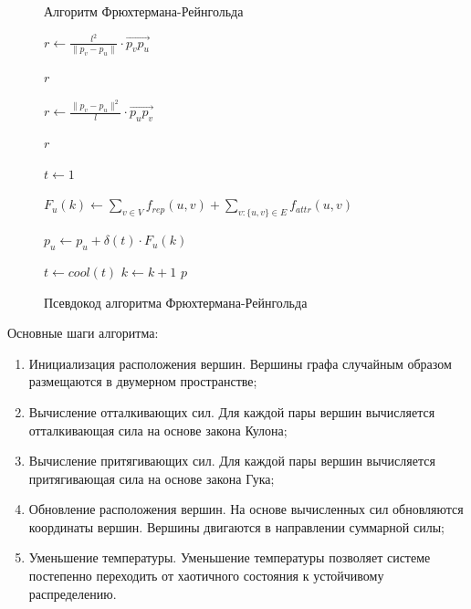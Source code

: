 \documentclass[14pt, russian]{scrartcl}
\begin{document}
\begin{figure}[H]
\centering
  \begin{minipage}[t]{.9\textwidth}
  \centering

\begin{algorithm}[H]
\caption{Алгоритм Фрюхтермана-Рейнгольда}
\begin{algorithmic}

  \State $r \gets \frac{l^2}{\|p_v - p_u \|}  \cdot \overrightarrow{p_v p_u}  $
  
  \Return $r$  
  \EndFunction

 
  \State $r \gets \frac{\|p_v - p_u \|^2}{l} \cdot \overrightarrow{p_u p_v}  $
  
  \Return $r$  
  \EndFunction
 

	\State $t \gets 1$

			\State $F_{u}(k) \gets \sum_{v \in V}{f_{rep}(u, v)} + \sum_{v:\{u,v\} \in E}{f_{attr}(u, v)}$
		

		\EndFor
      \State $p_u \gets p_u + \delta(t) \cdot F_u(k)$
		\EndFor
		
    \State $t \gets cool(t)$
		\State $k \gets k + 1$
	\EndWhile
	\Return $p$
	\EndFunction

\end{algorithmic}
\end{algorithm}
  \end{minipage}
\caption{Псевдокод алгоритма Фрюхтермана-Рейнгольда}
\label{fig:fr_alg}
\end{figure}


Основные шаги алгоритма:

\begin{enumerate}
  \item{Инициализация расположения вершин. Вершины графа случайным образом размещаются в двумерном пространстве;}
  \item{Вычисление отталкивающих сил. Для каждой пары вершин вычисляется отталкивающая сила на основе закона Кулона;}
  \item{Вычисление притягивающих сил. Для каждой пары вершин вычисляется притягивающая сила на основе закона Гука;}
  \item{Обновление расположения вершин. На основе вычисленных сил обновляются координаты вершин. Вершины двигаются в направлении суммарной силы;}
  \item{Уменьшение температуры. Уменьшение температуры позволяет системе постепенно переходить от хаотичного состояния к устойчивому распределению.
}

\end{enumerate}
\end{document}
